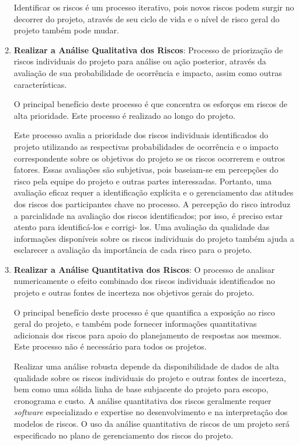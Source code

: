 \documentclass[
	12pt,
	openright,
	twoside,
	a4paper,
	english,
	brazil
	]{abntex2}
\begin{document}
\begin{enumerate}
  Identificar os riscos é um processo iterativo, pois novos riscos podem surgir no decorrer do projeto, através de seu ciclo de vida e o nível de risco geral do projeto também pode mudar.

  \item \textbf{Realizar a Análise Qualitativa dos Riscos}: Processo de priorização de riscos individuais do projeto para análise ou ação posterior, através da avaliação de sua probabilidade de ocorrência e impacto, assim como outras características.
  
  O principal benefício deste processo é que concentra os esforços em riscos de alta prioridade. Este processo é realizado ao longo do projeto.
  
  Este processo avalia a prioridade dos riscos individuais identificados do projeto utilizando as respectivas probabilidades de ocorrência e o impacto correspondente sobre os objetivos do projeto se os riscos ocorrerem e outros fatores. Essas avaliações são subjetivas, pois baseiam-se em percepções do risco pela equipe do projeto e outras partes interessadas. Portanto, uma avaliação eficaz requer a identificação explícita e o gerenciamento das atitudes dos riscos dos participantes chave no processo. A percepção do risco introduz a parcialidade na avaliação dos riscos identificados; por isso, é preciso estar atento para identificá-los e corrigi- los. Uma avaliação da qualidade das informações disponíveis sobre os riscos individuais do projeto também ajuda a esclarecer a avaliação da importância de cada risco para o projeto.

  \item \textbf{Realizar a Análise Quantitativa dos Riscos}: O processo de analisar numericamente o efeito combinado dos riscos individuais identificados no projeto e outras fontes de incerteza nos objetivos gerais do projeto.
  
  O principal benefício deste processo é que quantifica a exposição ao risco geral do projeto, e também pode fornecer informações quantitativas adicionais dos riscos para apoio do planejamento de respostas aos mesmos. Este processo não é necessário para todos os projetos.
  
  Realizar uma análise robusta depende da disponibilidade de dados de alta qualidade sobre os riscos individuais do projeto e outras fontes de incerteza, bem como uma sólida linha de base subjacente do projeto para escopo, cronograma e custo. A análise quantitativa dos riscos geralmente requer \textit{software} especializado e expertise no desenvolvimento e na interpretação dos modelos de riscos. O uso da análise quantitativa de riscos de um projeto será especificado no plano de gerenciamento dos riscos do projeto.


\end{enumerate}
\end{document}
